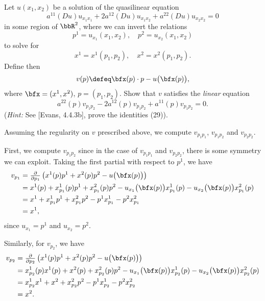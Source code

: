 \begin{problem}
  Let \(u(x_1,x_2)\) be a solution of the quasilinear equation
  \[
    a^{11}(Du)u_{x_1x_1}+ 2a^{12}(Du)u_{x_1x_2}+a^{22}(Du)u_{x_2x_2}=0
  \]
  in some region of \(\bbR^2\), where we can invert the relations
  \[
    p^1=u_{x_1}(x_1,x_2),\quad p^2=u_{x_2}(x_1,x_2)
  \]
  to solve for
  \[
    x^1=x^1(p_1,p_2),\quad x^2=x^2(p_1,p_2).
  \]
  Define then
  \[
    v(p)\defeq \bfx(p)\cdot p-u\bigl(\bfx(p)\bigr),
  \]
  where \(\bfx=(x^1,x^2)\), \(p=(p_1,p_2)\). Show that \(v\) satisfies the
  \emph{linear} equation
  \[
    a^{22}(p)v_{p_1p_2}-2a^{12}(p)v_{p_1p_2}+a^{11}(p)v_{p_1p_2}=0.
  \]
  (\emph{Hint:} See [Evans, 4.4.3b], prove the identities (29)).
\end{problem}
\begin{solution}
  Assuming the regularity on \(v\) prescribed above, we compute
  \(v_{p_1p_1}\), \(v_{p_1p_2}\) and \(v_{p_2p_2}\).

  First, we compute \(v_{p_1p_2}\) since in the case of \(v_{p_1p_1}\) and
  \(v_{p_2p_2}\), there is some symmetry we can exploit. Taking the first
  partial with respect to \(p^1\), we have
  \begin{equation}
    \label{eq:3:vp1}
    \begin{aligned}
      v_{p_1} &=\tfrac{\partial}{\partial
        p_1}\left(x^1(p)p^1+x^2(p)p^2-u\bigl(\bfx(p)\bigr)\right)\\
      &=x^1(p)+x^1_{p_1}(p)p^1+x^2_{p_1}(p)p^2
      -u_{x_1}\bigl(\bfx(p)\bigr)x^1_{p_1}(p)-u_{x_2}\bigl(\bfx(p)\bigr)x^2_{p_1}(p)\\
      &=x^1+x^1_{p_1}p^1+x^2_{p_1}p^2-p^1x^1_{p_1}-p^2x^2_{p_1}\\
      &=x^1,
    \end{aligned}
  \end{equation}
  since \(u_{x_1}=p^1\) and \(u_{x_2}=p^2\).

  Similarly, for \(v_{p_2}\), we have
  \begin{equation}
    \label{eq:3:vp2}
    \begin{aligned}
      v_{p_2} &=\tfrac{\partial}{\partial
        p_2}\left(x^1(p)p^1+x^2(p)p^2-u\bigl(\bfx(p)\bigr)\right)\\
      &=x^1_{p_2}(p)x^1(p)+x^2(p)+x^2_{p_2}(p)p^2
      -u_{x_1}\bigl(\bfx(p)\bigr)x^1_{p_2}(p)
      -u_{x_2}\bigl(\bfx(p)\bigr)x^2_{p_2}(p)\\
      &=x^1_{p_2}x^1+x^2+x^2_{p_2}p^2
      -p^1x^1_{p_2}
      -p^2x^2_{p_2}\\
      &=x^2.
    \end{aligned}
  \end{equation}


\end{solution}
